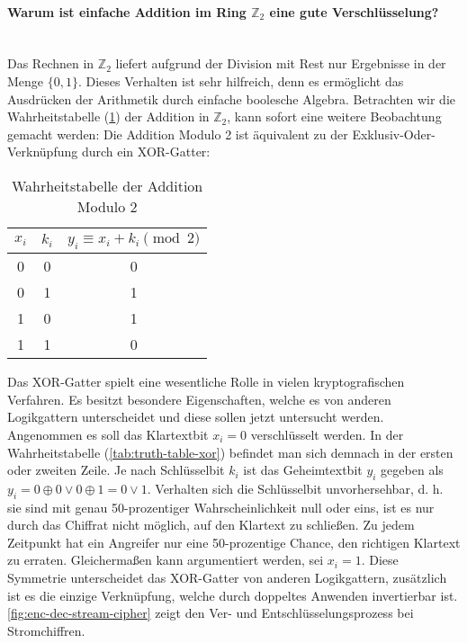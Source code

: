 \paragraph{Warum ist einfache Addition im Ring $\mathbb{Z}_2$ eine gute Verschlüsselung?}\mbox{}\\
Das Rechnen in $\mathbb{Z}_2$ liefert aufgrund der Division mit Rest nur Ergebnisse in
der Menge $\{0,1\}$. Dieses Verhalten ist sehr hilfreich, denn es ermöglicht das Ausdrücken der
Arithmetik durch einfache boolesche Algebra.
Betrachten wir die Wahrheitstabelle (\ref{tab:truth-table-addition-mod-2})
der Addition in $\mathbb{Z}_2$, kann sofort eine weitere Beobachtung gemacht werden:
Die Addition Modulo 2 ist äquivalent zu der Exklusiv-Oder-Verknüpfung durch ein
XOR-Gatter:

\begin{table}[h]
  \centering
  \caption{Wahrheitstabelle der Addition Modulo 2}
  \begin{tabular}{cc|c}
    $x_i$ & $k_i$ & $y_i \equiv x_i + k_i \pmod{2}$ \\ \hline
    0     & 0     & 0                               \\
    0     & 1     & 1                               \\
    1     & 0     & 1                               \\
    1     & 1     & 0                               \\
  \end{tabular}
  \label{tab:truth-table-addition-mod-2}
\end{table}

\noindent
Das XOR-Gatter spielt eine wesentliche Rolle in vielen kryptografischen Verfahren.
Es besitzt besondere Eigenschaften, welche es von anderen Logikgattern
unterscheidet und diese sollen jetzt untersucht werden.
Angenommen es soll das Klartextbit $x_i = 0$ verschlüsselt werden. In der Wahrheitstabelle
(\ref{tab:truth-table-xor}) befindet
man sich demnach in der ersten oder zweiten Zeile.
Je nach Schlüsselbit $k_i$ ist das Geheimtextbit $y_i$ gegeben als
$y_i = 0 \oplus 0 \vee 0 \oplus 1 = 0 \vee 1$.
Verhalten sich die Schlüsselbit unvorhersehbar, d. h. sie sind mit genau 50-prozentiger
Wahrscheinlichkeit null oder eins, ist es nur durch das Chiffrat nicht möglich, auf
den Klartext zu schließen. Zu jedem Zeitpunkt hat ein Angreifer nur eine
50-prozentige Chance, den richtigen Klartext zu erraten.
Gleichermaßen kann argumentiert werden, sei $x_i = 1$.
Diese Symmetrie unterscheidet das XOR-Gatter von anderen Logikgattern, zusätzlich ist es die einzige
Verknüpfung, welche durch doppeltes Anwenden invertierbar ist.
\autoref{fig:enc-dec-stream-cipher} zeigt den Ver- und Entschlüsselungsprozess
bei Stromchiffren.

